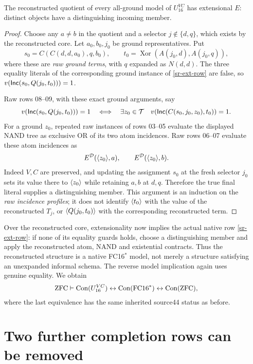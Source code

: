 \begin{srlemma}\label{sr-ext}
The reconstructed quotient of every all-ground model of $U_{16}^{VC}$ has
extensional $E$: distinct objects have a distinguishing incoming member.
\end{srlemma}
\begin{proof}
Choose any $a\ne b$ in the quotient and a selector $j\notin\{d,q\}$,
which exists by the reconstructed core. Let $a_0,b_0,j_0$ be ground
representatives. Put
\[
s_0=C(C(d,d,a_0),q,b_0),\qquad
t_0=\operatorname{Xor}(A(j_0,d),A(j_0,q)),
\]
where these are \emph{raw ground terms}, with $q$ expanded as $N(d,d)$.
The three equality literals of the corresponding ground instance of
\eqref{sr-ext-row} are false, so $v(\mathsf{Inc}(s_0,Q(j_0,t_0)))=1$.

Raw rows 08--09, with these exact ground arguments, say
\[
v(\mathsf{Inc}(s_0,Q(j_0,t_0)))=1
 \quad\Longleftrightarrow\quad
\exists z_0\in\mathcal T\quad
 v(\mathsf{Inc}(C(s_0,j_0,z_0),t_0))=1.
\]
For a ground $z_0$, repeated raw instances of rows 03--05 evaluate the
displayed NAND tree as exclusive OR of its two atom incidences. Raw rows
06--07 evaluate these atom incidences as
\[
E^{\mathcal D}(\langle z_0\rangle,a),\qquad
E^{\mathcal D}(\langle z_0\rangle,b).
\]
Indeed $V,C$ are preserved, and updating the assignment $s_0$ at the fresh
selector $j_0$ sets its value there to $\langle z_0\rangle$ while retaining $a,b$
at $d,q$. Therefore the true final literal supplies a distinguishing
member. This argument is an induction on the \emph{raw incidence profiles};
it does not identify $\langle t_0\rangle$ with the value of the reconstructed
$T_j$, or $\langle Q(j_0,t_0)\rangle$ with the corresponding reconstructed term.
\end{proof}

Over the reconstructed core, extensionality now implies the actual native
row \eqref{sr-ext-row}: if none of its equality guards holds, choose a
distinguishing member and apply the reconstructed atom, NAND and existential
contracts. Thus the reconstructed structure is a native FC16$^*$ model,
not merely a structure satisfying an unexpanded informal schema. The
reverse model implication again uses genuine equality. We obtain
\[
\mathrm{ZFC}\vdash
\operatorname{Con}(U_{16}^{VC})\leftrightarrow\operatorname{Con}(\mathrm{FC16}^*)
\leftrightarrow\operatorname{Con}(\mathrm{ZFC}),
\]
where the last equivalence has the same inherited source44 status as before.

\section{Two further completion rows can be removed}

